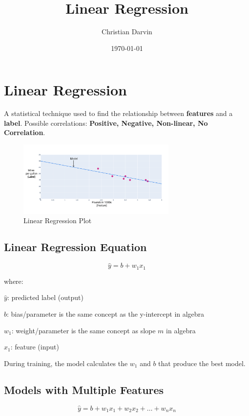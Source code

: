 \documentclass[a4paper,12pt]{article}
\title{Linear Regression}
\author{Christian Darvin}
\date{\today}
\begin{document}
\maketitle

\section*{Linear Regression}
A statistical technique used to find the relationship between \textbf{features} and a \textbf{label}. Possible correlations: \textbf{Positive, Negative, Non-linear, No Correlation}.
\begin{figure}[h]
    \centering
    \includegraphics[width=0.7\textwidth]{../Images/linear-regression-plot.png}
    \caption{Linear Regression Plot}
    \label{fig:linear-regression-plot}
\end{figure}

\subsection*{Linear Regression Equation}

\begin{equation}
\hat{y} = b + w_1 x_1
\end{equation}

\noindent where:

$\hat{y}$: predicted label (output)

$b$: bias/parameter is the same concept as the y-intercept in algebra
 
$w_1$: weight/parameter is the same concept as slope $m$ in algebra

$x_1$: feature (input) \newline

\noindent During training, the model calculates the $w_1$ and $b$ that produce the best model.

\subsection*{Models with Multiple Features}
\begin{equation}
\hat{y} = b + w_1 x_1 + w_2 x_2 + \dots + w_n x_n
\end{equation}
\end{document}

